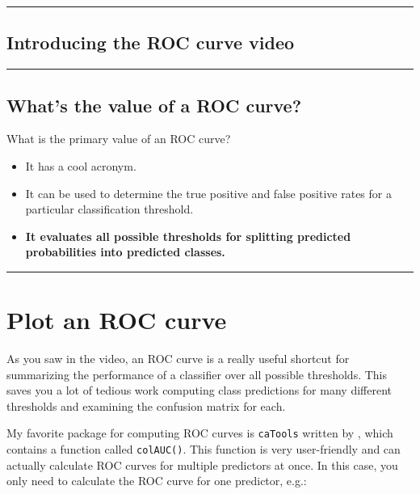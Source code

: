 \documentclass[]{book}
\begin{document}
\begin{center}\rule{0.5\linewidth}{\linethickness}\end{center}

\subsection*{Introducing the ROC curve
video}\label{introducing-the-roc-curve-video}

\begin{center}\rule{0.5\linewidth}{\linethickness}\end{center}

\subsection*{What's the value of a ROC
curve?}\label{whats-the-value-of-a-roc-curve}

What is the primary value of an ROC curve?

\begin{itemize}
\item
  It has a cool acronym.
\item
  It can be used to determine the true positive and false positive rates
  for a particular classification threshold.
\item
  \textbf{It evaluates all possible thresholds for splitting predicted
  probabilities into predicted classes.}
\end{itemize}

\begin{center}\rule{0.5\linewidth}{\linethickness}\end{center}

\section{Plot an ROC curve}\label{plot-an-roc-curve}

As you saw in the video, an ROC curve is a really useful shortcut for
summarizing the performance of a classifier over all possible
thresholds. This saves you a lot of tedious work computing class
predictions for many different thresholds and examining the confusion
matrix for each.

My favorite package for computing ROC curves is \texttt{caTools} written
by \citet{R-caTools}, which contains a function called
\texttt{colAUC()}. This function is very user-friendly and can actually
calculate ROC curves for multiple predictors at once. In this case, you
only need to calculate the ROC curve for one predictor, e.g.:
\end{document}
